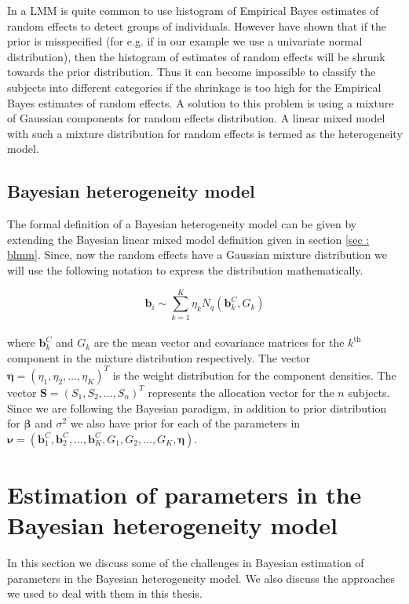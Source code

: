 In a LMM is quite common to use histogram of Empirical Bayes estimates of random effects to detect groups of individuals. However \citet{verbeke_linear_1996} have shown that if the prior is misspecified (for e.g. if in our example we use a univariate normal distribution), then the histogram of estimates of random effects will be shrunk towards the prior distribution. Thus it can become impossible to classify the subjects into different categories if the shrinkage is too high for the Empirical Bayes estimates of random effects. A solution to this problem is using a mixture of Gaussian components for random effects distribution. A linear mixed model with such a mixture distribution for random effects is termed as the heterogeneity model.

\subsection{Bayesian heterogeneity model}
\label{subsec : bhtge}
The formal definition of a Bayesian heterogeneity model can be given by extending the Bayesian linear mixed model definition given in section \ref{sec : blmm}. Since, now the random effects have a Gaussian mixture distribution we will use the following notation to express the distribution mathematically.

$$\boldsymbol{b}_i \sim \sum_{k=1}^{K} \eta_k N_q(\boldsymbol{b}_k^C, G_k)$$\\
where $\boldsymbol{b}_k^C$ and $G_k$ are the mean vector and covariance matrices for the $k^\text{th}$ component in the mixture distribution respectively. The vector $\boldsymbol{\eta} = (\eta_1, \eta_2, \ldots, \eta_K)^T$ is the weight distribution for the component densities. The vector $\boldsymbol{S}=(S_1, S_2, ..., S_n)^T$ represents the allocation vector for the $n$ subjects. Since we are following the Bayesian paradigm, in addition to prior distribution for $\boldsymbol{\beta}$ and $\sigma^2$ we also have prior for each of the parameters in $\boldsymbol{\nu} = (\boldsymbol{b}_1^C, \boldsymbol{b}_2^C, \ldots, \boldsymbol{b}_K^C, G_1, G_2, \ldots, G_K, \boldsymbol{\eta})$.

\section{Estimation of parameters in the Bayesian heterogeneity model}
In this section we discuss some of the challenges in Bayesian estimation of parameters in the Bayesian heterogeneity model. We also discuss the approaches we used to deal with them in this thesis.

